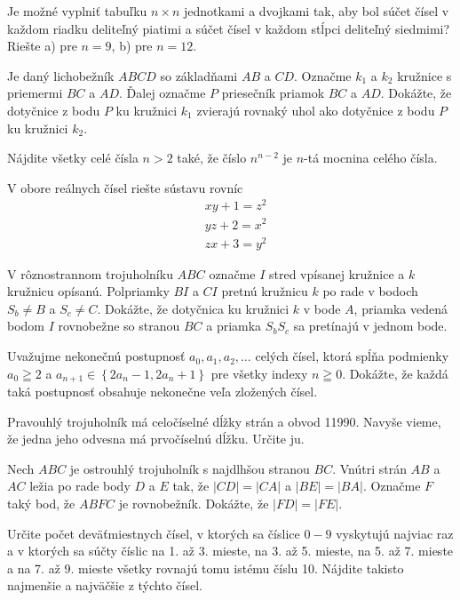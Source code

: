 ﻿{%
Je možné vyplniť tabuľku $n \times n$ jednotkami a dvojkami tak, aby bol súčet čísel v každom riadku deliteľný piatimi a súčet čísel v každom stĺpci deliteľný siedmimi? Riešte
a) pre $n=9$,
b) pre $n=12$.}

{%
Je daný lichobežník $A B C D$ so základňami $A B$ a $C D$. Označme $k_{1}$ a $k_{2}$ kružnice s priemermi $B C$ a $A D$. Ďalej označme $P$ priesečník priamok $B C$ a $A D$. Dokážte, že dotyčnice z bodu $P$ ku kružnici $k_{1}$ zvierajú rovnaký uhol ako dotyčnice z bodu $P$ ku kružnici $k_{2}$.}

{%
Nájdite všetky celé čísla $n>2$ také, že číslo $n^{n-2}$ je $n$-tá mocnina celého čísla.}

{%
V obore reálnych čísel riešte sústavu rovníc
$$
\begin{aligned}
& x y+1=z^{2} \\
& y z+2=x^{2} \\
& z x+3=y^{2}
\end{aligned}
$$}

{%
V rôznostrannom trojuholníku $A B C$ označme $I$ stred vpísanej kružnice a $k$ kružnicu opísanú. Polpriamky $B I$ a $C I$ pretnú kružnicu $k$ po rade v bodoch $S_{b} \neq B$ a $S_{c} \neq C$. Dokážte, že dotyčnica ku kružnici $k$ v bode $A$, priamka vedená bodom $I$ rovnobežne so stranou $B C$ a priamka $S_{b} S_{c}$ sa pretínajú v jednom bode.}

{%
Uvažujme nekonečnú postupnosť $a_{0}, a_{1}, a_{2}, \ldots$ celých čísel, ktorá spĺňa podmienky $a_{0} \geqq 2$ a $a_{n+1} \in\left\{2 a_{n}-1,2 a_{n}+1\right\}$ pre všetky indexy $n \geqq 0$. Dokážte, že každá taká postupnosť obsahuje nekonečne veľa zložených čísel.}

{%
Pravouhlý trojuholník má celočíselné dĺžky strán a obvod 11990. Navyše vieme, že jedna jeho odvesna má prvočíselnú dĺžku. Určite ju.}

{%
Nech $A B C$ je ostrouhlý trojuholník s najdlhšou stranou $B C$. Vnútri strán $A B$ a $A C$ ležia po rade body $D$ a $E$ tak, že $|C D|=|C A|$ a $|B E|=|B A|$. Označme $F$ taký bod, že $A B F C$ je rovnobežník. Dokážte, že $|F D|=|F E|$.}

{%
Určite počet deväťmiestnych čísel, v ktorých sa číslice $0-9$ vyskytujú najviac raz a v ktorých sa súčty číslic na 1. až 3. mieste, na 3. až 5. mieste, na 5. až 7. mieste a na 7. až 9. mieste všetky rovnajú tomu istému číslu 10. Nájdite takisto najmenšie a najväčšie z týchto čísel.}

